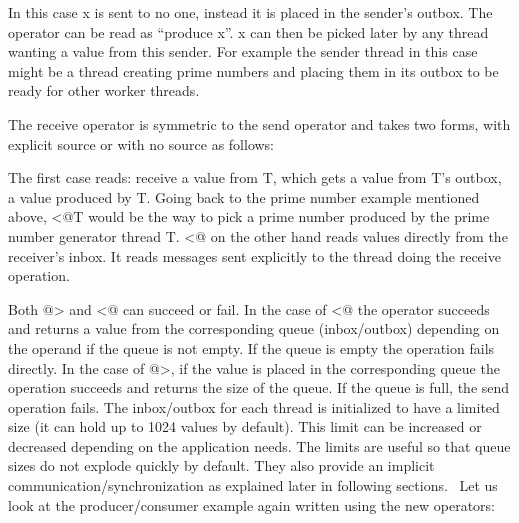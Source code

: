 
In this case \textsf{x} is sent to no one, instead it is
placed in the sender{\textquoteright}s outbox. The operator can be read
as {\textquotedblleft}produce
\textsf{x{\textquotedblright}}. \textsf{x} can
then be picked later by any thread wanting a value from this sender.
For example the sender thread in this case might be a thread creating
prime numbers and placing them in its outbox to be ready for other
worker threads.

The receive operator is symmetric to the send operator and takes two
forms, with explicit source or with no source as follows:


The first case reads: receive a value from T, which gets a value from
\textsf{T}{\textquoteright}s outbox, a value produced by
\textsf{T}. Going back to the prime number example mentioned
above, \textsf{{\textless}@T} would be the way to pick a
prime number produced by the prime number generator thread
\textsf{T}. \textsf{{\textless}@} on the other
hand reads values directly from the receiver{\textquoteright}s inbox.
It reads messages sent explicitly to the thread doing the receive
operation.

Both \textsf{@{\textgreater}} and
\textsf{{\textless}@ }can succeed or fail. In the case
of \textsf{{\textless}@} the operator succeeds and
returns a value from the corresponding queue (inbox/outbox) depending
on the operand if the queue is not empty. If the queue is empty the
operation fails directly. In the case of
\textsf{@{\textgreater}}, if the value is placed in the
corresponding queue the operation succeeds and returns the size of the
queue. If the queue is full, the send operation fails. The inbox/outbox
for each thread is initialized to have a limited size (it can hold up
to 1024 values by default). This limit can be increased or decreased
depending on the application needs. The limits are useful so that queue
sizes do not explode quickly by default. They also provide an implicit
communication/synchronization as explained later in following sections.
\ Let us look at the producer/consumer example again written using the
new operators:

